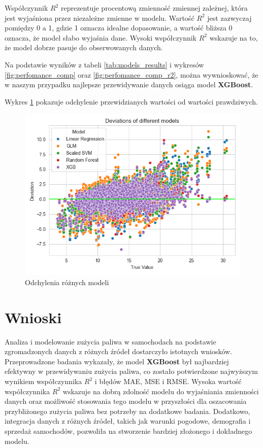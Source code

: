 \documentclass[9pt,a4paper,twoside]{rho}
\begin{document}
        Współczynnik \(R^2\) reprezentuje procentową zmienność zmiennej zależnej, która jest wyjaśniona przez niezależne zmienne w modelu. Wartość \(R^2\) jest zazwyczaj pomiędzy 0 a 1, gdzie 1 oznacza idealne dopasowanie, a wartość bliższa 0 oznacza, że model słabo wyjaśnia dane. Wysoki współczynnik \(R^2\) wskazuje na to, że model dobrze pasuje do obserwowanych danych.

        Na podstawie wyników z tabeli \ref{tab:models_results} i wykresów \ref{fig:perfomance_comp} oraz \ref{fig:perfomance_comp_r2}, można wywnioskować, że w naszym przypadku najlepsze przewidywanie danych osiąga model \textbf{XGBoost}.

        Wykres \ref{fig:models_deviation} pokazuje odchylenie przewidzianych wartości od wartości prawdziwych.

        \begin{figure}[H]
            \centering
            \includegraphics[width=1\columnwidth]{plots/Deviations of different models.png}
            \caption{Odchylenia różnych modeli}
            \label{fig:models_deviation}
        \end{figure}

\section*{Wnioski}
    Analiza i modelowanie zużycia paliwa w samochodach na podstawie zgromadzonych danych z różnych źródeł dostarczyło istotnych wniosków. Przeprowadzone badania wykazały, że model \textbf{XGBoost} był najbardziej efektywny w przewidywaniu zużycia paliwa, co zostało potwierdzone najwyższym wynikiem współczynnika \(R^2\) i błędów MAE, MSE i RMSE. Wysoka wartość współczynnika \(R^2\) wskazuje na dobrą zdolność modelu do wyjaśniania zmienności danych oraz możliwość stosowania tego modelu w przyszłości dla oszacowania przybliżonego zużycia paliwa bez potrzeby na dodatkowe badania. Dodatkowo, integracja danych z różnych źródeł, takich jak warunki pogodowe, demografia i sprzedaż samochodów, pozwoliła na stworzenie bardziej złożonego i dokładnego modelu.


\printbibliography[title={Źródła}]

\end{document}
